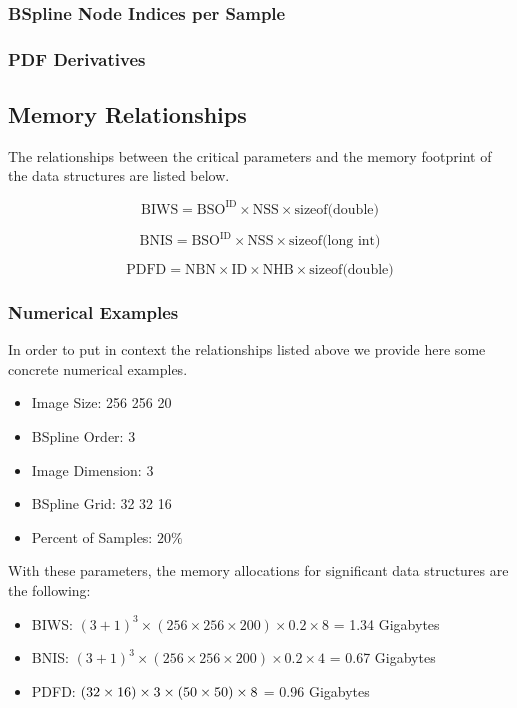 \documentclass{InsightArticle}
\begin{document}
\subsubsection{BSpline Node Indices per Sample}
\subsubsection{PDF Derivatives}

\subsection{Memory Relationships}

The relationships between the critical parameters and the memory footprint of
the data structures are listed below.

\begin{equation}
\mbox{BIWS} = \mbox{BSO}^{\mbox{ID}} \times \mbox{NSS} \times \mbox{sizeof(double)}
\end{equation}

\begin{equation}
\mbox{BNIS} = \mbox{BSO}^{\mbox{ID}} \times \mbox{NSS} \times \mbox{sizeof(long int)}
\end{equation}

\begin{equation}
\mbox{PDFD} = \mbox{NBN} \times \mbox{ID} \times \mbox{NHB} \times  \mbox{sizeof(double)}
\end{equation}


\subsubsection{Numerical Examples}

In order to put in context the relationships listed above we provide here some
concrete numerical examples.

\begin{itemize}
\item Image Size: 256 256 20
\item BSpline Order: 3
\item Image Dimension: 3
\item BSpline Grid: 32 32 16
\item Percent of Samples: $20\%$
\end{itemize}

With these parameters, the memory allocations for significant data structures
are the following:


\begin{itemize}
\item BIWS: $(3+1)^3 \times (256 \times 256 \times 200 ) \times 0.2 \times 8 $ = 1.34 Gigabytes 
\item BNIS: $(3+1)^3 \times (256 \times 256 \times 200 ) \times 0.2 \times 4 $ = 0.67 Gigabytes 
\item PDFD: $(32 \time 32 \times 16 ) \times 3 \times ( 50 \times 50 ) \times 8$ = 0.96 Gigabytes
\end{itemize}
\end{document}
